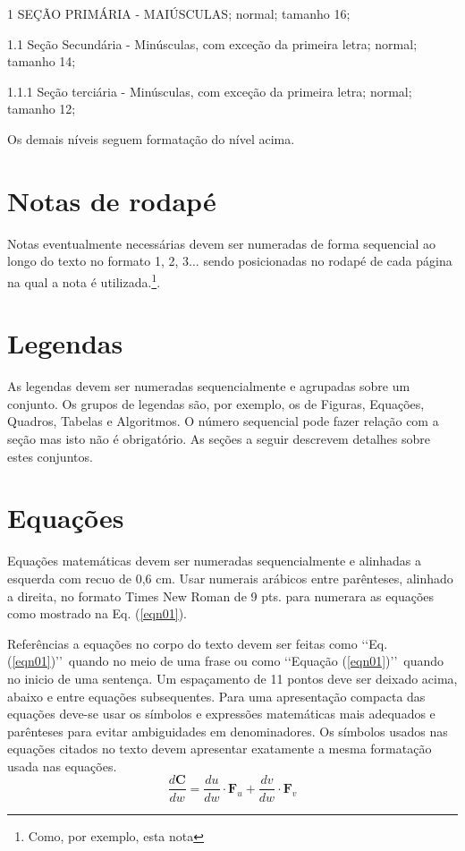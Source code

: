 \begin{description}

	\item 1 SEÇÃO PRIMÁRIA - MAIÚSCULAS; normal; tamanho 16;

	\item 1.1 Seção Secundária - Minúsculas, com exceção da primeira letra; normal; tamanho 14;

	\item 1.1.1 Seção terciária - Minúsculas, com exceção da 
	primeira letra; normal; tamanho 12;

	\item Os demais níveis seguem formatação do nível acima. 

\end{description}



\section{Notas de rodapé}

Notas eventualmente necessárias devem ser numeradas de forma sequencial ao longo do texto no formato 1, 2, 3... sendo posicionadas no rodapé de cada página na qual a nota é utilizada.\footnote{Como, por exemplo, esta nota}.

\section{Legendas}

As legendas devem ser numeradas sequencialmente e agrupadas sobre um conjunto. Os grupos de legendas são, por exemplo, os de Figuras, Equações, Quadros, Tabelas e Algoritmos. O número sequencial pode fazer relação com a seção mas isto não é obrigatório. As seções a seguir descrevem detalhes sobre estes conjuntos.

\section{Equações}

Equações matemáticas devem ser numeradas sequencialmente e alinhadas a esquerda com recuo de 0,6 cm. Usar numerais arábicos entre parênteses, alinhado a direita, no formato Times New Roman de 9 pts. para numerara as equações como mostrado na Eq. (\ref{eqn01}).

Referências a equações no corpo do texto devem ser feitas como \lq\lq Eq. (\ref{eqn01})\rq\rq\ quando no meio de uma frase ou como \lq\lq Equação (\ref{eqn01})\rq\rq\ quando no inicio de uma sentença. Um espaçamento de 11 pontos deve ser deixado acima, abaixo e entre equações subsequentes. Para uma apresentação compacta das equações deve-se usar os símbolos e expressões matemáticas mais adequados e parênteses para evitar ambiguidades em denominadores. Os símbolos usados nas equações citados no texto devem apresentar exatamente a mesma formatação usada nas equações.
\begin{equation}
\label{eqn01}
	\frac{d\mathbf{C}}{dw} = \frac{du}{dw}\cdot \mathbf{F}_u + 
		\frac{dv}{dw}\cdot \mathbf{F}_v 
\end{equation}

